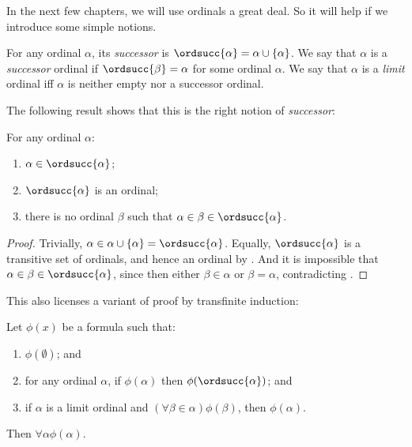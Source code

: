\documentclass[../../../include/open-logic-section]{subfiles}
\begin{document}

In the next few chapters, we will use ordinals a great deal. So it
will help if we introduce some simple notions. 

\begin{defn}
For any ordinal $\alpha$, its \emph{successor} is $\ordsucc{\alpha}
=\alpha \cup \{\alpha\}$. We say that $\alpha$ is a \emph{successor}
ordinal if $\ordsucc{\beta} = \alpha$ for some ordinal $\alpha$. We
say that $\alpha$ is a \emph{limit} ordinal iff $\alpha$ is neither
empty nor a successor ordinal.
\end{defn}
\noindent
The following result shows that this is the right notion of
\emph{successor}:

\begin{prop}
For any ordinal $\alpha$:
\begin{enumerate}
	\item $\alpha \in \ordsucc{\alpha}$;
	\item $\ordsucc{\alpha}$ is an ordinal;
	\item there is no ordinal $\beta$ such that $\alpha \in \beta \in
	\ordsucc{\alpha}$.
	\end{enumerate}
\end{prop}

\begin{proof}
Trivially, $\alpha \in \alpha \cup \{\alpha\} = \ordsucc{\alpha}$.
Equally, $\ordsucc{\alpha}$ is a transitive set of ordinals, and hence
an ordinal by .
And it is impossible that $\alpha \in \beta \in \ordsucc{\alpha}$,
since then either $\beta \in \alpha$ or $\beta = \alpha$,
contradicting .
\end{proof}
\noindent
This also licenses a variant of proof by transfinite induction:

\begin{thm}
Let $\phi(x)$ be a formula such that:
\begin{enumerate}
	\item $\phi(\emptyset)$; and
	\item for any ordinal $\alpha$, if $\phi(\alpha)$ then
	$\phi(\ordsucc{\alpha})$; and 
	\item if $\alpha$ is a limit ordinal and $(\forall \beta \in
	\alpha)\phi(\beta)$, then $\phi(\alpha)$.
\end{enumerate}
Then $\forall \alpha \phi(\alpha)$.
\end{thm}
\end{document}
